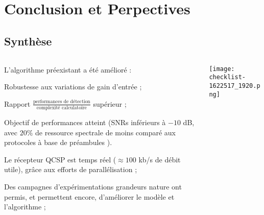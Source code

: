 \documentclass[../main.tex]{subfiles}
\begin{document}
\section{Conclusion et Perpectives}

\subsection{Synthèse}

\begin{frame}{\subsecname}
  \begin{columns}
    \begin{column}{.7 \linewidth}
      \begin{ctrlitemize}{1 em}
        \item L'algorithme préexistant a été amélioré :
        \begin{ctrlitemize}{.5 em}
          \item Robustesse aux variations de gain d'entrée ;%
          \item Rapport $\frac{\text{performances de détection}}{\text{complexité calculatoire}}$ supérieur ;
          \item Objectif de performances atteint {\tiny (SNRs inférieurs à $-10$ dB, avec $20 \%$ de ressource spectrale de moins comparé aux protocoles à base de préambules \cite{saiedThesis2022})}.
        \end{ctrlitemize}
        \item Le  récepteur QCSP est temps réel ($\approx 100$ kb/s de débit utile), grâce aux efforts de parallélisation ;
        \item Des campagnes d'expérimentations grandeurs nature ont permis, et permettent encore, d'améliorer le modèle et l'algorithme ;
      \end{ctrlitemize}
    \end{column}
    \begin{column}{.3 \linewidth}
      \texttt{[image: checklist-1622517\_1920.png]}
    \end{column}
  \end{columns}
\end{frame}
\end{document}
